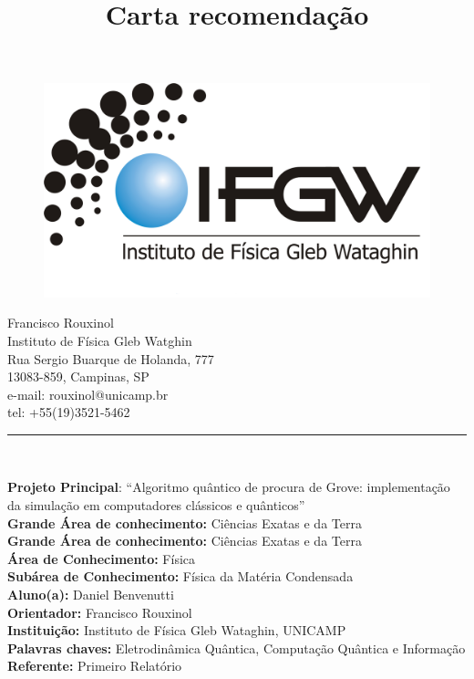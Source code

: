 \documentclass[12pt,a4paper]{article}
\title{Carta recomendação}
\makeatletter
\def\vhrulefill#1{\leavevmode\leaders\hrule\@height#1\hfill \kern\z@}
\makeatother
\begin{document}
\begin{figure}
\includegraphics[scale=0.111]{logo-documentos.png}
\end{figure}



\noindent 
\begin{flushright}
\begin{scriptsize}
Francisco Rouxinol \\
Instituto de Física Gleb Watghin\\
Rua Sergio Buarque de Holanda, 777\\
13083-859, Campinas, SP \\
e-mail: rouxinol@unicamp.br\\
tel: +55(19)3521-5462\\
\vhrulefill{1pt} \\ %
\end{scriptsize}
\end{flushright}




\begin{flushleft}
\textbf{Projeto Principal}: “Algoritmo quântico de procura de Grove: implementação da simulação em computadores clássicos e quânticos”\\
\textbf{Grande Área de conhecimento:} Ciências Exatas e da Terra\\
\textbf{Grande Área de conhecimento: }Ciências Exatas e da Terra\\
\textbf{Área de Conhecimento:} Física\\
\textbf{Subárea de Conhecimento: }Física da Matéria Condensada\\
\textbf{Aluno(a):} Daniel Benvenutti\\
\textbf{Orientador: }Francisco Rouxinol\\
\textbf{Instituição:} Instituto de Física Gleb Wataghin, UNICAMP\\
\textbf{Palavras chaves:} Eletrodinâmica Quântica, Computação Quântica e Informação\\
\textbf{Referente:} Primeiro Relatório
\end{flushleft}
\end{document}
